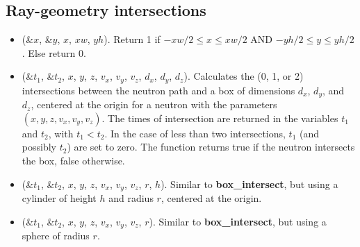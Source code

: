 \subsection{Ray-geometry intersections}
\begin{itemize}
\item {}(\&$x$, \&$y$, $x$, $xw$, $yh$).
  Return 1 if $-xw/2 \leq x \leq xw/2$ AND $-yh/2 \leq y \leq yh/2$.
  Else return 0.
\item {}(\&$t_1$, \&$t_2$, $x$, $y$, $z$, $v_x$, $v_y$, $v_z$,
  $d_x$, $d_y$, $d_z$). Calculates the (0, 1, or 2) intersections between
  the neutron path and a box of dimensions $d_x$, $d_y$, and $d_z$,
  centered at the origin for a neutron with the parameters
  $(x,y,z,v_x,v_y,v_z)$. The times of intersection are returned
  in the variables $t_1$ and $t_2$, with $t_1 < t_2$. In the case
  of less than two intersections, $t_1$ (and possibly $t_2$) are set to
  zero. The function returns true if the neutron intersects the box,
  false otherwise.
\item {}(\&$t_1$, \&$t_2$, $x$, $y$, $z$, $v_x$, $v_y$, $v_z$,
  $r$, $h$).  Similar to \textbf{box\_intersect}, but using a cylinder of height $h$ and radius $r$,
  centered at the origin.
\item {}(\&$t_1$, \&$t_2$, $x$, $y$, $z$, $v_x$, $v_y$, $v_z$,
  $r$). Similar to \textbf{box\_intersect}, but using a sphere
  of radius $r$.
\end{itemize}

